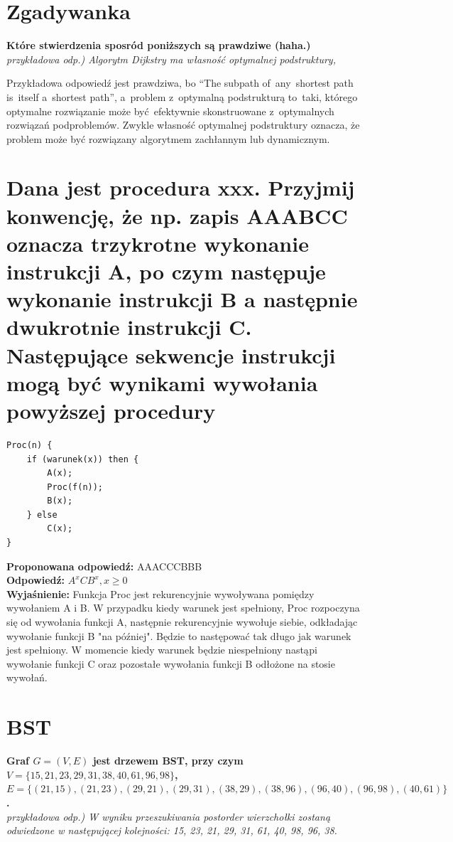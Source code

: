 \section{Zgadywanka}
\textbf{Które stwierdzenia sposród poniższych są prawdziwe (haha.)}\\
\textit{przykładowa odp.) Algorytm Dijkstry ma własność optymalnej podstruktury,}

\vspace{0.4cm}

Przykładowa odpowiedź jest prawdziwa, bo ``The subpath of~any~shortest path is~itself a~shortest path'', a~problem z~optymalną podstrukturą to~taki, którego optymalne rozwiązanie może być~efektywnie skonstruowane z~optymalnych rozwiązań podproblemów. Zwykle własność optymalnej podstruktury oznacza, że problem może być rozwiązany algorytmem zachłannym lub dynamicznym.




\section{Dana jest procedura xxx. Przyjmij konwencję, że np. zapis AAABCC oznacza trzykrotne wykonanie instrukcji A, po czym następuje wykonanie instrukcji B a następnie dwukrotnie instrukcji C. Następujące sekwencje instrukcji mogą być wynikami wywołania powyższej procedury}
\begin{lstlisting}
Proc(n) {
	if (warunek(x)) then {
		A(x);
		Proc(f(n));
		B(x);
	} else
		C(x);
}
\end{lstlisting}

\vspace{0.4cm}
\noindent \textbf{Proponowana odpowiedź:} AAACCCBBB \\ 

\noindent \textbf{Odpowiedź:} $A^xCB^x, x \ge 0$ \\

\noindent \textbf{Wyjaśnienie:}
Funkcja Proc jest rekurencyjnie wywoływana pomiędzy wywołaniem A i B. W przypadku kiedy warunek jest spełniony, Proc rozpoczyna się od wywołania funkcji A, następnie rekurencyjnie wywołuje siebie, odkładając wywołanie funkcji B "na później". Będzie to następować tak długo jak warunek jest spełniony. W momencie kiedy warunek będzie niespełniony nastąpi wywołanie funkcji C oraz pozostałe wywołania funkcji B odłożone na stosie wywołań. \\

\section{BST}
\textbf{Graf $G = (V, E)$ jest drzewem BST, przy czym $V = \{15, 21, 23, 29, 31, 38, 40, 61, 96, 98\}$, $E = \{(21, 15),(21, 23),(29, 21),(29, 31),(38, 29),(38, 96),(96, 40),(96, 98),(40, 61)\}$.}\\
\textit{przykładowa odp.) W wyniku przeszukiwania postorder wierzchołki zostaną odwiedzone w następującej kolejności: 15, 23, 21, 29, 31, 61, 40, 98, 96, 38.}

